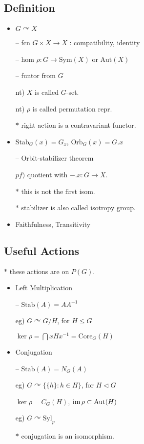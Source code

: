 \documentclass{article}
\begin{document}
\subsection*{Definition}
\begin{itemize}
\item $G\curvearrowright X$
	\par-- fcn $G\times X\to X$ : compatibility, identity
	\par-- hom $\rho\colon G\to\text{Sym}(X)$ or $\text{Aut}(X)$
	\par-- funtor from $G$
	\par nt) $X$ is called $G$-set.
	\par nt) $\rho$ is called permutation repr.
	\par$*$ right action is a contravariant functor.
\item $\text{Stab}_G(x)=G_x$, $\text{Orb}_G(x)=G.x$
	\par-- Orbit-stabilizer theorem
		\par\quad$pf)$ quotient with $-.x\colon G\to X$.
		\par\quad$*$ this is not the first isom.
	\par$*$ stabilizer is also called isotropy group.
\item Faithfulness, Transitivity
\end{itemize}


\subsection*{Useful Actions}
$*$ these actions are on $P(G)$.
\begin{itemize}
\item Left Multiplication
	\par-- $\text{Stab}(A)=AA^{-1}$
	\par eg) $G\curvearrowright G/H$, for $H\le G$
		\par\qquad $\ker\rho=\bigcap xHx^{-1}=\text{Core}_G(H)$
\item Conjugation
	\par-- $\text{Stab}(A)=N_G(A)$
	\par eg) $G\curvearrowright\{\{h\}:h\in H\}$, for $H\lhd G$
		\par\qquad $\ker\rho=C_G(H)$, $\operatorname{im}\rho\subset\text{Aut}(H)$
	\par eg) $G\curvearrowright\text{Syl}_p$
	\par$*$ conjugation is an isomorphism.
\end{itemize}
\end{document}
